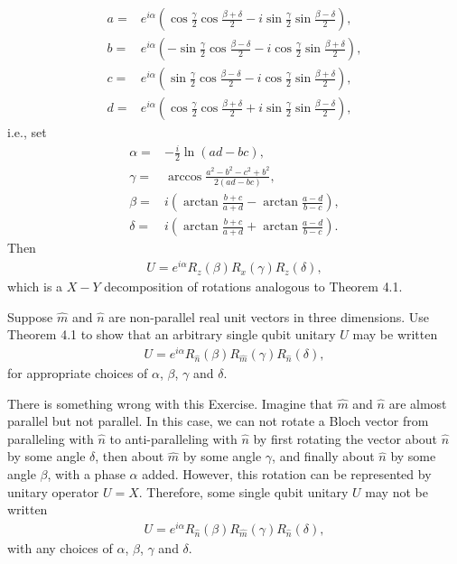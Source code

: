 \documentclass[en]{sol-man}
\begin{document}
\begin{sol}
    \begin{align}
        a=&e^{i\alpha}\left(\cos\frac{\gamma}{2}\cos\frac{\beta+\delta}{2}-i\sin\frac{\gamma}{2}\sin\frac{\beta-\delta}{2}\right),\\
        b=&e^{i\alpha}\left(-\sin\frac{\gamma}{2}\cos\frac{\beta-\delta}{2}-i\cos\frac{\gamma}{2}\sin\frac{\beta+\delta}{2}\right),\\
        c=&e^{i\alpha}\left(\sin\frac{\gamma}{2}\cos\frac{\beta-\delta}{2}-i\cos\frac{\gamma}{2}\sin\frac{\beta+\delta}{2}\right),\\
        d=&e^{i\alpha}\left(\cos\frac{\gamma}{2}\cos\frac{\beta+\delta}{2}+i\sin\frac{\gamma}{2}\sin\frac{\beta-\delta}{2}\right),
    \end{align}
    i.e., set
    \begin{align}
        \alpha=&-\frac{i}{2}\ln(ad-bc),\\
        \gamma=&\arccos\frac{a^2-b^2-c^2+b^2}{2(ad-bc)},\\
        \beta=&i\left(\arctan\frac{b+c}{a+d}-\arctan\frac{a-d}{b-c}\right),\\
        \delta=&i\left(\arctan\frac{b+c}{a+d}+\arctan\frac{a-d}{b-c}\right).
    \end{align}
    Then
    \begin{align}
        U=e^{i\alpha}R_z(\beta)R_x(\gamma)R_z(\delta),
    \end{align}
    which is a $X-Y$ decomposition of rotations analogous to Theorem 4.1.
\end{sol}

\begin{exe}
    Suppose $\hat{m}$ and $\hat{n}$ are non-parallel real unit vectors in three dimensions. Use Theorem 4.1 to show that an arbitrary single qubit unitary $U$ may be written
    \begin{align}
        U=e^{i\alpha}R_{\hat{n}}(\beta)R_{\hat{m}}(\gamma)R_{\hat{n}}(\delta),
    \end{align}
    for appropriate choices of $\alpha$, $\beta$, $\gamma$ and $\delta$.
\end{exe}
\begin{pf}
    There is something wrong with this Exercise. Imagine that $\hat{m}$ and $\hat{n}$ are almost parallel but not parallel. In this case, we can not rotate a Bloch vector from paralleling with $\hat{n}$ to anti-paralleling with $\hat{n}$ by first rotating the vector about $\hat{n}$ by some angle $\delta$, then about $\hat{m}$ by some angle $\gamma$, and finally about $\hat{n}$ by some angle $\beta$, with a phase $\alpha$ added. However, this rotation can be represented by unitary operator $U=X$. Therefore, some single qubit unitary $U$ may not be written
    \begin{align}
        U=e^{i\alpha}R_{\hat{n}}(\beta)R_{\hat{m}}(\gamma)R_{\hat{n}}(\delta),
    \end{align}
    with any choices of $\alpha$, $\beta$, $\gamma$ and $\delta$.
\end{pf}
\end{document}
